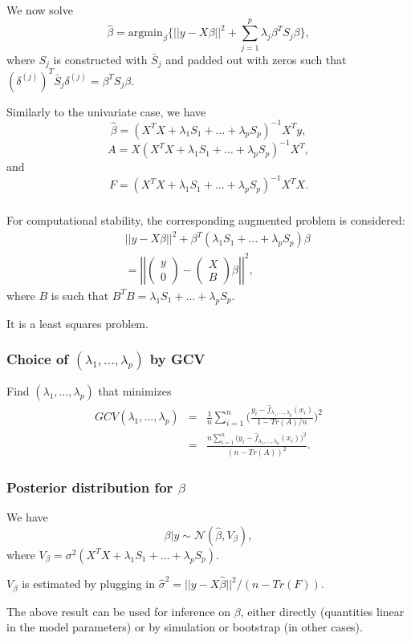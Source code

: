 \documentclass{beamer}
\newcommand{\bs}{\bigskip}
\begin{document}
\begin{frame}
\frametitle{}
We now solve
 $$\hat{\beta} = \mbox{argmin}_{\beta} \{  ||y - X \beta ||^2 + \sum_{j=1}^{p} \lambda_j  \beta^T S_j \beta \},$$
where $S_j$ is constructed with $\bar{S}_j$ and padded out with zeros such that
$(\delta^{(j)})^T \bar{S}_j \delta^{(j)} = \beta^T S_j \beta$.

\bs
Similarly to the univariate case, we have
$$\hat{\beta} = (X^T X + \lambda_1 S_1 + \ldots + \lambda_p S_p)^{-1} X^T y,$$
$$A = X (X^T X + \lambda_1 S_1 + \ldots + \lambda_p S_p)^{-1} X^T,$$
and
$$F = (X^T X + \lambda_1 S_1 + \ldots + \lambda_p S_p)^{-1} X^T X .$$
\end{frame}


\begin{frame}
\frametitle{}
For computational stability, the corresponding augmented problem is considered:
\begin{eqnarray*}
& & \left|\left| y - X \beta \right|\right|^2 + \beta^T (\lambda_1 S_1 +
\ldots + \lambda_p S_p) \beta \\
& & = \left|\left|
\left(\begin{array}{c}
y \\
0
\end{array} \right) -
\left(\begin{array}{c}
X \\
B
\end{array} \right) \beta
\right|\right|^2,
\end{eqnarray*}
where $B$ is such that $B^T B = \lambda_1 S_1 + \ldots + \lambda_p S_p.$

\bs
It is a least squares problem.
\end{frame}

\begin{frame}
\frametitle{Choice of $(\lambda_1, \ldots, \lambda_p)$ by GCV}

Find $(\lambda_1, \ldots, \lambda_p)$ that minimizes
\begin{eqnarray}
GCV(\lambda_1, \ldots, \lambda_p) & = &   \frac{1}{n} \sum_{i=1}^n \Big(\frac{y_i -
  \hat{f}_{\lambda_1, \ldots, \lambda_p}(x_i)}{1-Tr(A)/n} \Big)^2 \\
  & = &  \frac{n \sum_{i=1}^n \Big(y_i -
  \hat{f}_{\lambda_1, \ldots, \lambda_p}(x_i)\Big)^2}{(n-Tr(A))^2}.
\end{eqnarray}

\end{frame}



\begin{frame}
\frametitle{Posterior distribution for $\beta$}
We have
$$ \beta | y \sim {\mathcal N}(\hat{\beta}, V_{\beta}),$$
where $V_{\beta} = \sigma^2 (X^T X + \lambda_1 S_1 + \ldots + \lambda_p S_p)$.

\bs 
$V_{\beta}$ is estimated by plugging in $\hat{\sigma}^2 = ||y - X
\hat{\beta}||^2/ (n - Tr(F))$. 

\bs
The above result can be used for inference on $\beta$, either directly (quantities linear in the model parameters) or by simulation or bootstrap (in other cases).
\end{frame}
\end{document}
